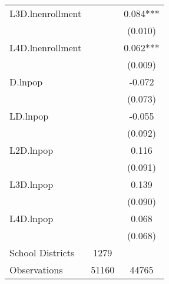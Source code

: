 \begin{tabular}{lcc}
L3D.lnenrollment    &  & 0.084*** \\
                    &  & (0.010) \\
L4D.lnenrollment    &  & 0.062*** \\
                    &  & (0.009) \\
D.lnpop             &  & -0.072 \\
                    &  & (0.073) \\
LD.lnpop            &  & -0.055 \\
                    &  & (0.092) \\
L2D.lnpop           &  & 0.116 \\
                    &  & (0.091) \\
L3D.lnpop           &  & 0.139 \\
                    &  & (0.090) \\
L4D.lnpop           &  & 0.068 \\
                    &  & (0.068) \\
\hline
School Districts    & 1279 & \\
Observations        & 51160 & 44765 \\
\hline
\end{tabular}
